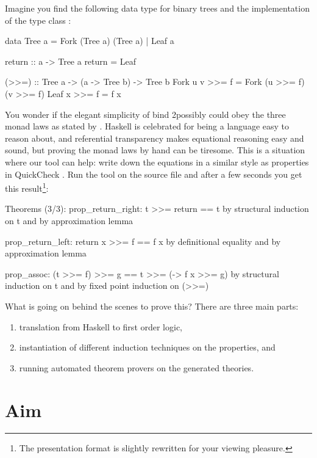 
Imagine you find the following data type for binary trees
\citep{grafting} and the implementation of the  type class
\citep{mtl}:

\begin{code}
data Tree a = Fork (Tree a) (Tree a) | Leaf a

return :: a -> Tree a
return = Leaf

(>>=) :: Tree a -> (a -> Tree b) -> Tree b
Fork u v >>= f = Fork (u >>= f) (v >>= f)
Leaf x   >>= f = f x
\end{code}

\noindent
You wonder if the elegant simplicity of bind 2possibly could obey the
three monad laws as stated by \cite{essenceoffp}. Haskell is
celebrated for being a language easy to reason about, and referential
transparency makes equational reasoning easy and sound, but proving
the monad laws by hand can be tiresome. This is a situation where our
tool can help: write down the equations in a similar style as
properties in QuickCheck \citep{quickcheck}. Run the tool on the
source file and after a few seconds you get this result\footnote{The
  presentation format is slightly rewritten for your viewing
  pleasure.}:

\begin{code}
Theorems (3/3):
  prop_return_right: t >>= return == t
    by structural induction on t and by approximation lemma

  prop_return_left: return x >>= f == f x
    by definitional equality and by approximation lemma

  prop_assoc: (t >>= f) >>= g == t >>= (\x -> f x >>= g)
    by structural induction on t and by fixed point induction on (>>=)
\end{code}

What is going on behind the scenes to prove this?  There are three
main parts:

\begin{enumerate}
\item translation from Haskell to first order logic,
\item instantiation of different induction techniques on the
  properties, and
\item running automated theorem provers on the generated theories.
\end{enumerate}

\section{Aim}

